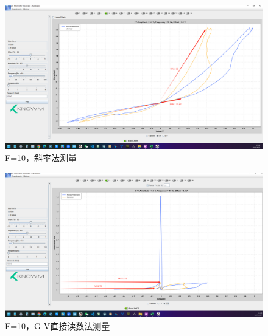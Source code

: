 \documentclass[12pt,hyperref,a4paper,UTF8]{ctexart}
\begin{document}
\begin{figure}[H]
    \centering
    \begin{minipage}{1\textwidth}
        \centering
        \includegraphics[width=1\textwidth]{figures/F101D.png}
        \caption{F=10，斜率法测量}
        \label{fig:F10_slope_method}
    \end{minipage}
\end{figure}

\begin{figure}[H]
    \centering
    \begin{minipage}{1\textwidth}
        \centering
        \includegraphics[width=1\textwidth]{figures/F102D.png}
        \caption{F=10，G-V直接读数法测量}
        \label{fig:F10_GV_method}
    \end{minipage}
\end{figure}
\end{document}
